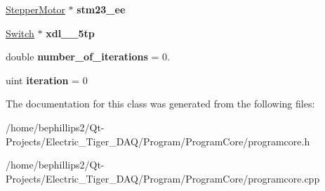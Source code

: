 \begin{DoxyCompactItemize}
\item 
\hyperlink{class_stepper_motor}{Stepper\+Motor} $\ast$ {\bfseries stm23\+\_\+ee}\hypertarget{classetig_1_1_program_core_ae54ac562120bf6c622f08cccd1eb2885}{}\label{classetig_1_1_program_core_ae54ac562120bf6c622f08cccd1eb2885}

\item 
\hyperlink{class_switch}{Switch} $\ast$ {\bfseries xdl\+\_\+\_\+5tp}\hypertarget{classetig_1_1_program_core_afd776ceb26508e55631f6bc20de623fe}{}\label{classetig_1_1_program_core_afd776ceb26508e55631f6bc20de623fe}

\item 
double {\bfseries number\+\_\+of\+\_\+iterations} = 0.\hypertarget{classetig_1_1_program_core_a4f29550ef3feda2f0818009f977e4db5}{}\label{classetig_1_1_program_core_a4f29550ef3feda2f0818009f977e4db5}

\item 
uint {\bfseries iteration} = 0\hypertarget{classetig_1_1_program_core_a2b9431f383533162e5dad9881e3bd2ac}{}\label{classetig_1_1_program_core_a2b9431f383533162e5dad9881e3bd2ac}

\end{DoxyCompactItemize}


The documentation for this class was generated from the following files\+:\begin{DoxyCompactItemize}
\item 
/home/bephillips2/\+Qt-\/\+Projects/\+Electric\+\_\+\+Tiger\+\_\+\+D\+A\+Q/\+Program/\+Program\+Core/programcore.\+h\item 
/home/bephillips2/\+Qt-\/\+Projects/\+Electric\+\_\+\+Tiger\+\_\+\+D\+A\+Q/\+Program/\+Program\+Core/programcore.\+cpp\end{DoxyCompactItemize}
